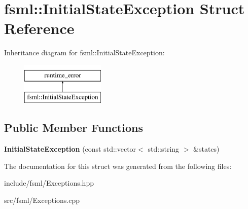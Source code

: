 \hypertarget{structfsml_1_1InitialStateException}{\section{fsml\-:\-:Initial\-State\-Exception Struct Reference}
\label{structfsml_1_1InitialStateException}
}
Inheritance diagram for fsml\-:\-:Initial\-State\-Exception\-:\begin{figure}[H]
\begin{center}
\leavevmode
\includegraphics[height=2.000000cm]{structfsml_1_1InitialStateException}
\end{center}
\end{figure}
\subsection*{Public Member Functions}
\begin{DoxyCompactItemize}
\item 
\hypertarget{structfsml_1_1InitialStateException_ae4cf2e419f5f5d221af4d7de2907dbb5}{{\bfseries Initial\-State\-Exception} (const std\-::vector$<$ std\-::string $>$ \&states)}\label{structfsml_1_1InitialStateException_ae4cf2e419f5f5d221af4d7de2907dbb5}

\end{DoxyCompactItemize}


The documentation for this struct was generated from the following files\-:\begin{DoxyCompactItemize}
\item 
include/fsml/Exceptions.\-hpp\item 
src/fsml/Exceptions.\-cpp\end{DoxyCompactItemize}
